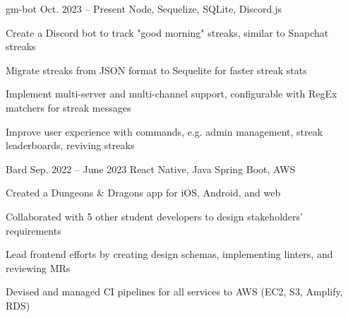 \fontdir[fonts/]

\begin{cvprojects}

  \cvproject
  {gm-bot}
  {\href{https://github.com/KevinIsMyName/gm-bot}{\faGithubSquare\acvHeaderIconSep\@KevinIsMyName}}
  {Oct. 2023 -- Present}
  {Node, Sequelize, SQLite, Discord.js}
  {
    \begin{cvitems}
      \item Create a Discord bot to track "good morning" streaks, similar to Snapchat streaks
      \item Migrate streaks from JSON format to Sequelite for faster streak stats
      \item Implement multi-server and multi-channel support, configurable with RegEx matchers for streak messages
      \item Improve user experience with commands, e.g. admin management, streak leaderboards, reviving streaks
    \end{cvitems}
  }


  \cvproject
  {Bard}
  {\href{https://gitlab.com/drexel_se/senior_project/ay22_bard/bard}{\faGithubSquare\acvHeaderIconSep\@KevinIsMyName}}
  {Sep. 2022 -- June 2023}
  {React Native, Java Spring Boot, AWS}
  {
    \begin{cvitems}
      \item Created a Dungeons \& Dragons app for iOS, Android, and web
      \item Collaborated with 5 other student developers to design stakeholders' requirements
      \item Lead frontend efforts by creating design schemas, implementing linters, and reviewing MRs
      \item Devised and managed CI pipelines for all services to AWS (EC2, S3, Amplify, RDS)
    \end{cvitems}
  }




\end{cvprojects}
